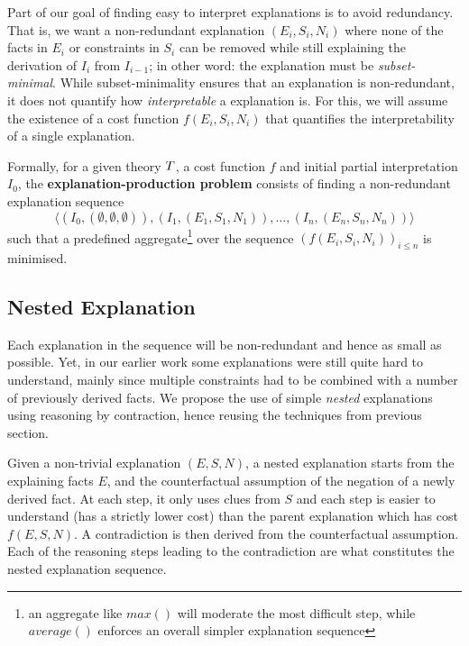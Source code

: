 Part of our goal of finding easy to interpret explanations is to avoid redundancy.
That is, we want a non-redundant explanation $(E_i,S_i,N_i)$ where none of the facts in $E_i$ or constraints in $S_i$ can be removed while still explaining the derivation of $I_i$ from $I_{i-1}$; in other word: the explanation must be \textit{subset-minimal}.
While subset-minimality ensures that an explanation is non-redundant, it does not quantify how \textit{interpretable} a explanation is.
For this, we will assume the existence of a cost function $f(E_i,S_i,N_i)$ that quantifies the interpretability of a single explanation.

Formally, for a given theory $T$, a cost function $f$ and initial partial interpretation $I_0$, the \textbf{explanation-production problem} consists of finding a non-redundant explanation sequence
\[\langle(I_0,(\emptyset,\emptyset,\emptyset)), (I_1,(E_1,S_1,N_1)), \dots ,(I_n,(E_n,S_n,N_n))\rangle\]
such that a predefined aggregate\footnote{an aggregate like $max()$ will moderate the most difficult step, while $average()$ enforces an overall simpler explanation sequence} over the sequence $\left(f(E_i,S_i,N_i)\right)_{i\leq n}$ is minimised.

\subsection{Nested Explanation}
Each explanation in the sequence will be non-redundant and hence as small as possible. 
Yet, in our earlier work some explanations were still quite hard to understand, mainly since multiple constraints had to be combined with a number of previously derived facts. 
We propose the use of simple \textit{nested} explanations using reasoning by contraction, hence reusing the techniques from previous section. 

Given a non-trivial explanation $(E,S,N)$, a nested explanation starts from the explaining facts $E$, and the counterfactual assumption of the negation of a newly derived fact. 
At each step, it only uses clues from $S$ and each step is easier to understand (has a strictly lower cost) than the parent explanation which has cost $f(E,S,N)$. 
A contradiction is then derived from the counterfactual assumption.
Each of the reasoning steps leading to the contradiction are what constitutes the nested explanation sequence.
